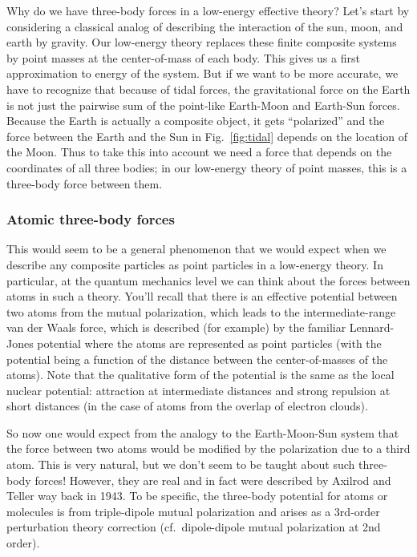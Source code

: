 Why do we have three-body forces in a low-energy effective theory?
Let's start by considering a classical analog of describing the interaction
of the sun, moon, and earth by gravity.  
Our low-energy theory replaces these finite composite systems by point
masses at the center-of-mass of each body.
This gives us a first approximation to energy of the system.  But if we
want to be more accurate, we have to recognize that because of tidal
forces, 
the gravitational force on the
Earth is not just the pairwise sum of the point-like
Earth-Moon and Earth-Sun forces.
Because the Earth is actually a composite object, it gets ``polarized''
and the force between the Earth and the Sun in Fig.~\ref{fig:tidal}
depends on the location of the Moon.  Thus to take this into account
we need a force that depends on the coordinates of all three bodies;
in our low-energy theory of point masses, this is a three-body force
between them.

\subsubsection{Atomic three-body forces}

This would seem to be a general phenomenon that we would expect when
we describe any composite particles as point particles in a low-energy
theory.  In particular, at the quantum mechanics level
 we can think about the forces between atoms in
such a theory.  You'll recall that there is an effective potential 
between two atoms from the mutual polarization, which leads to the
intermediate-range van der Waals force, which is described (for example)
by the familiar Lennard-Jones potential where the atoms are represented
as point particles (with the potential being a function of the distance
between the center-of-masses of the atoms).  
Note that the qualitative form of the potential
is the same as the local nuclear potential: attraction at intermediate
distances and strong repulsion at short distances (in the case of atoms
from the overlap of electron clouds).

So now one would expect from the analogy to the Earth-Moon-Sun system
that the force between two atoms would be modified by the polarization
due to a third atom.  This is very natural, but we don't seem to be
taught about such three-body forces!  However, they are real and in fact were
described by Axilrod and Teller way back in 1943.  To be specific,
the three-body potential for atoms or molecules is from triple-dipole
mutual polarization and arises as a 3rd-order perturbation theory correction
(cf.\ dipole-dipole mutual polarization at 2nd order).

